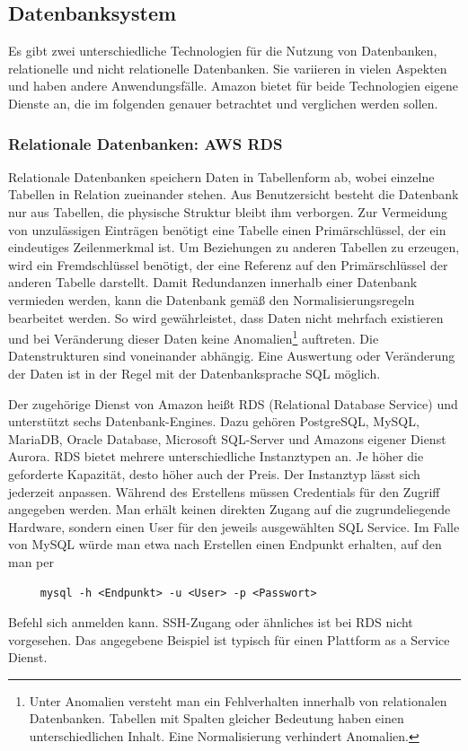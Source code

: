 \subsection{Datenbanksystem}
Es gibt zwei unterschiedliche Technologien für die Nutzung von Datenbanken, relationelle und nicht relationelle Datenbanken.
Sie variieren in vielen Aspekten und haben andere Anwendungsfälle.
Amazon bietet für beide Technologien eigene Dienste an, die im folgenden genauer betrachtet und verglichen werden sollen.

\subsubsection{Relationale Datenbanken: AWS RDS}

Relationale Datenbanken speichern Daten in Tabellenform ab, wobei einzelne Tabellen in Relation zueinander stehen.
Aus Benutzersicht besteht die Datenbank nur aus Tabellen, die physische Struktur bleibt ihm verborgen.
Zur Vermeidung von unzulässigen Einträgen benötigt eine Tabelle einen Primärschlüssel, der ein eindeutiges Zeilenmerkmal ist.
Um Beziehungen zu anderen Tabellen zu erzeugen, wird ein Fremdschlüssel benötigt, der eine Referenz auf den Primärschlüssel der anderen Tabelle darstellt.
Damit Redundanzen innerhalb einer Datenbank vermieden werden, kann die Datenbank gemäß den Normalisierungsregeln bearbeitet werden.
So wird gewährleistet, dass Daten nicht mehrfach existieren und bei Veränderung dieser Daten keine Anomalien\footnote{Unter Anomalien versteht man ein Fehlverhalten innerhalb von relationalen Datenbanken. Tabellen
mit Spalten gleicher Bedeutung haben einen unterschiedlichen Inhalt. Eine Normalisierung verhindert Anomalien. } auftreten.
Die Datenstrukturen sind voneinander abhängig. Eine Auswertung oder Veränderung der Daten ist in der Regel mit der Datenbanksprache SQL möglich. \cite[]{Datenbankvergleich}

Der zugehörige Dienst von Amazon heißt RDS (Relational Database Service) und unterstützt sechs Datenbank-Engines. Dazu gehören
PostgreSQL, MySQL, MariaDB, Oracle Database, Microsoft SQL-Server und Amazons eigener Dienst Aurora.
RDS bietet mehrere unterschiedliche Instanztypen an.
Je höher die geforderte Kapazität, desto höher auch der Preis.
Der Instanztyp lässt sich jederzeit anpassen.
Während des Erstellens müssen Credentials für den Zugriff angegeben werden.
Man erhält keinen direkten Zugang auf die zugrundeliegende Hardware, sondern einen User für den jeweils ausgewählten SQL Service.
Im Falle von MySQL würde man etwa nach Erstellen einen Endpunkt erhalten, auf den man per
\begin{lstlisting}
     mysql -h <Endpunkt> -u <User> -p <Passwort>
    \end{lstlisting} Befehl sich anmelden kann. SSH-Zugang oder ähnliches ist bei RDS nicht vorgesehen.
    Das angegebene Beispiel ist typisch für einen Plattform as a Service Dienst.

